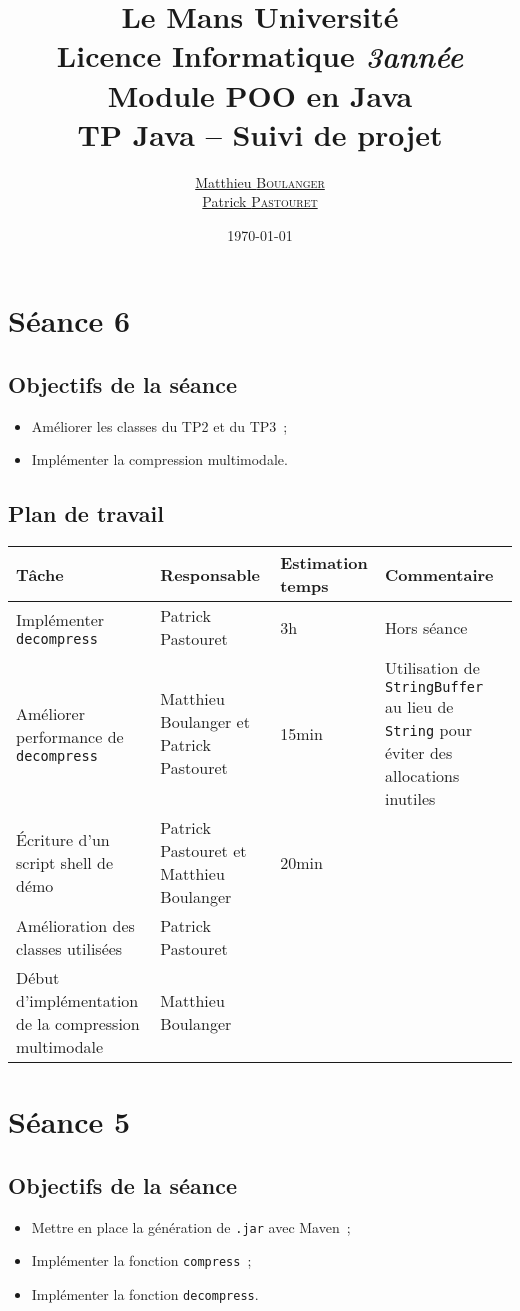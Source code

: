 \documentclass[a4paper,11pt]{article}
\title {\textbf {\color {blue} Le Mans Université}\color{black}
\\  Licence Informatique  \textit {3\ieme année}
 \\Module POO en Java
 \\ \textbf {TP Java – Suivi de projet}}
\author{\href{mailto: matthieu.boulanger.etu@univ-lemans.fr} {Matthieu \textsc{Boulanger}}\\
      \href{mailto: patrick.pastouret.etu@univ-lemans.fr} {Patrick \textsc{Pastouret}}}
\date{\today}
\begin{document}
\maketitle

\section{Séance 6}

\subsection{Objectifs de la séance}
\begin{itemize}
  \item Améliorer les classes du TP2 et du TP3~;
  \item Implémenter la compression multimodale.
\end{itemize}

\subsection{Plan de travail}
\begin{center}
    \begin{tabular}{p{.3\linewidth}p{.3\linewidth}p{.3\linewidth}p{.3\linewidth}}
      \toprule
	Tâche & Responsable & Estimation temps & Commentaire \\
      \midrule
      Implémenter \texttt{decompress} & Patrick Pastouret & 3h & Hors séance \\
      Améliorer performance de \texttt{decompress} & Matthieu Boulanger et Patrick Pastouret & 15min & Utilisation de \texttt{StringBuffer} au lieu de \texttt{String} pour éviter des allocations inutiles \\
      Écriture d’un script shell de démo & Patrick Pastouret et Matthieu Boulanger & 20min & \\
      Amélioration des classes utilisées & Patrick Pastouret &  & \\
      Début d’implémentation de la compression multimodale & Matthieu Boulanger &  & \\
      \bottomrule
   \end{tabular}
\end{center}

\section{Séance 5}

\subsection{Objectifs de la séance}
\begin{itemize}
    \item Mettre en place la génération de \texttt{.jar} avec Maven~;
    \item Implémenter la fonction \texttt{compress}~;
    \item Implémenter la fonction \texttt{decompress}.
\end{itemize}
\end{document}
